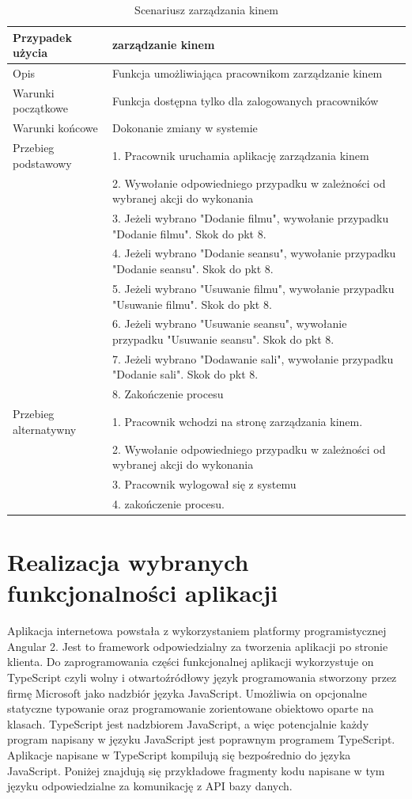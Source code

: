\begin{table}[H]
	\begin{tabularx}{\textwidth}{ |l|X| }
		\hline 
		Przypadek użycia & zarządzanie kinem  \\ 
		\hline 
		Opis & Funkcja umożliwiająca pracownikom zarządzanie kinem \\ 
		\hline 
		Warunki początkowe & Funkcja dostępna tylko dla zalogowanych pracowników \\ 
		\hline 
		Warunki końcowe & Dokonanie zmiany w systemie  \\ 
		\hline 
		Przebieg podstawowy & 1. Pracownik uruchamia aplikację zarządzania kinem \\ 
		& 2. Wywołanie odpowiedniego przypadku w zależności od wybranej akcji do wykonania \\
		& 3. Jeżeli wybrano "Dodanie filmu", wywołanie przypadku "Dodanie filmu". Skok do pkt 8. \\
		& 4. Jeżeli wybrano "Dodanie seansu", wywołanie przypadku "Dodanie seansu". Skok do pkt 8. \\
		& 5. Jeżeli wybrano "Usuwanie filmu", wywołanie przypadku "Usuwanie filmu". Skok do pkt 8. \\
		& 6. Jeżeli wybrano "Usuwanie seansu", wywołanie przypadku "Usuwanie seansu". Skok do pkt 8. \\
		& 7. Jeżeli wybrano "Dodawanie sali", wywołanie przypadku "Dodanie sali". Skok do pkt 8. \\
		& 8. Zakończenie procesu \\
		\hline
		Przebieg alternatywny & 1. Pracownik wchodzi na stronę zarządzania kinem. \\
		& 2. Wywołanie odpowiedniego przypadku w zależności od wybranej akcji do wykonania \\
		& 3. Pracownik wylogował się z systemu \\
		& 4. zakończenie procesu. \\
		\hline 
	\end{tabularx} 
	\caption{Scenariusz zarządzania kinem}
	\label{tab:scen3}   
\end{table}

\section{Realizacja wybranych funkcjonalności aplikacji}

Aplikacja internetowa powstała z wykorzystaniem platformy programistycznej Angular 2. Jest to framework odpowiedzialny za tworzenia aplikacji po stronie klienta. Do zaprogramowania części funkcjonalnej aplikacji wykorzystuje on TypeScript czyli wolny i otwartoźródłowy język programowania stworzony przez firmę Microsoft jako nadzbiór języka JavaScript. Umożliwia on opcjonalne statyczne typowanie oraz programowanie zorientowane obiektowo oparte na klasach. TypeScript jest nadzbiorem JavaScript, a więc potencjalnie każdy program napisany w języku JavaScript jest poprawnym programem TypeScript. Aplikacje napisane w TypeScript kompilują się bezpośrednio do języka JavaScript. Poniżej znajdują się przykładowe fragmenty kodu napisane w tym języku odpowiedzialne za komunikację z API bazy danych.  

